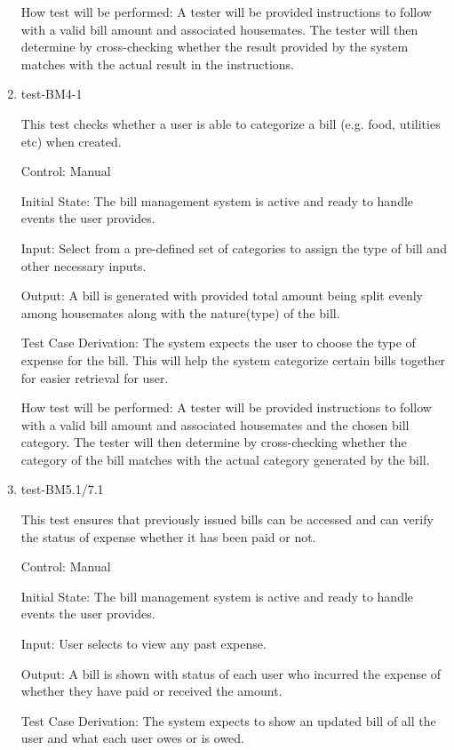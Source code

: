 \documentclass[12pt, titlepage]{article}
\begin{document}
\begin{enumerate}
How test will be performed: A tester will be provided instructions to follow with a valid bill amount and associated housemates. The tester will then determine by cross-checking whether the result provided by the system matches with the actual result in the instructions. 

\item{test-BM4-1\\}

This test checks whether a user is able to categorize a bill (e.g. food, utilities etc) when created. 

Control: Manual
					
Initial State: The bill management system is active and ready to handle events the user provides.
					
Input: Select from a pre-defined set of categories to assign the type of bill and other necessary inputs.
					
Output: A bill is generated with provided total amount being split evenly among housemates along with the nature(type) of the bill.

Test Case Derivation: The system expects the user to choose the type of expense for the bill. This will help the system categorize certain bills together for easier retrieval for user.
					
How test will be performed: A tester will be provided instructions to follow with a valid bill amount and associated housemates and the chosen bill category. The tester will then determine by cross-checking whether the category of the bill matches with the actual category generated by the bill.

\item{test-BM5.1/7.1\\}

This test ensures that previously issued bills can be accessed and can verify the status of expense whether it has been paid or not.

Control: Manual
					
Initial State: The bill management system is active and ready to handle events the user provides.
					
Input: User selects to view any past expense. 
					
Output: A bill is shown with status of each user who incurred the expense of whether they have paid or received the amount.

Test Case Derivation: The system expects to show an updated bill of all the user and what each user owes or is owed.


\end{enumerate}
\end{document}
